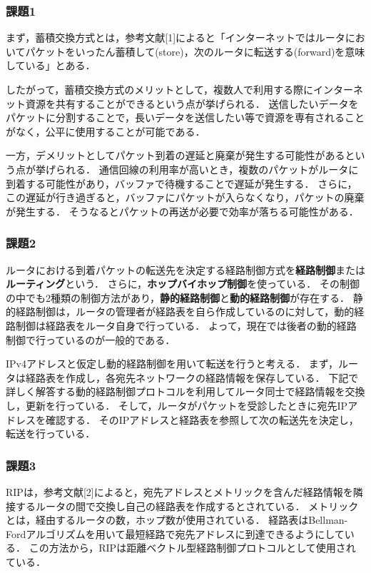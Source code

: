 \documentclass[documentclass]{jsarticle}
\begin{document}
\subsubsection*{課題1}
まず，蓄積交換方式とは，参考文献[1]によると「インターネットではルータにおいてパケットをいったん蓄積して(store)，次のルータに転送する(forward)を意味している」とある．

したがって，蓄積交換方式のメリットとして，複数人で利用する際にインターネット資源を共有することができるという点が挙げられる．
送信したいデータをパケットに分割することで，長いデータを送信したい等で資源を専有されることがなく，公平に使用することが可能である．

一方，デメリットとしてパケット到着の遅延と廃棄が発生する可能性があるという点が挙げられる．
通信回線の利用率が高いとき，複数のパケットがルータに到着する可能性があり，バッファで待機することで遅延が発生する．
さらに，この遅延が行き過ぎると，バッファにパケットが入らなくなり，パケットの廃棄が発生する．
そうなるとパケットの再送が必要で効率が落ちる可能性がある．

\subsubsection*{課題2}
ルータにおける到着パケットの転送先を決定する経路制御方式を\textbf{経路制御}または\textbf{ルーティング}という．
さらに，\textbf{ホップバイホップ制御}を使っている．
その制御の中でも2種類の制御方法があり，\textbf{静的経路制御}と\textbf{動的経路制御}が存在する．
静的経路制御は，ルータの管理者が経路表を自ら作成しているのに対して，動的経路制御は経路表をルータ自身で行っている．
よって，現在では後者の動的経路制御で行っているのが一般的である．

IPv4アドレスと仮定し動的経路制御を用いて転送を行うと考える．
まず，ルータは経路表を作成し，各宛先ネットワークの経路情報を保存している．
下記で詳しく解答する動的経路制御プロトコルを利用してルータ同士で経路情報を交換し，更新を行っている．
そして，ルータがパケットを受診したときに宛先IPアドレスを確認する．
そのIPアドレスと経路表を参照して次の転送先を決定し，転送を行っている．

\subsubsection*{課題3}
RIPは，参考文献[2]によると，宛先アドレスとメトリックを含んだ経路情報を隣接するルータの間で交換し自己の経路表を作成するとされている．
メトリックとは，経由するルータの数，ホップ数が使用されている．
経路表はBellman-Fordアルゴリズムを用いて最短経路で宛先アドレスに到達できるようにしている．
この方法から，RIPは距離ベクトル型経路制御プロトコルとして使用されている．
\end{document}
